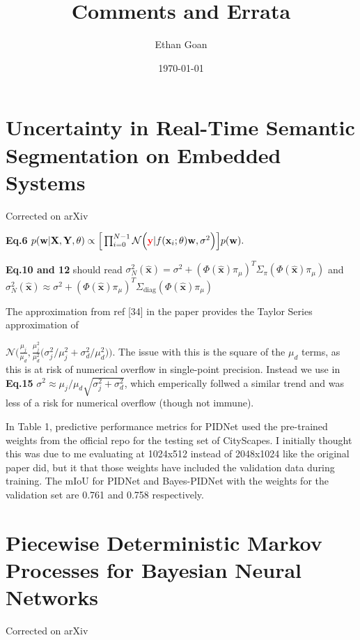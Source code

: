 \documentclass{article}
\title{{\titlefont Comments and Errata}}
\author{{\authorfont Ethan Goan}}
\date{\small \today}
\makeatletter
\renewcommand{\tableofcontents}{\@starttoc{toc}}
\makeatother
\begin{document}
\maketitle
\tableofcontents

\section{Uncertainty in Real-Time Semantic Segmentation on Embedded Systems}
Corrected on arXiv

\textbf{Eq.6}  $ p(\mathbf{w} | \mathbf{X}, \mathbf{Y} , \theta ) \propto \Big[\prod_{i=0}^{N-1}\mathcal{N}\Big({\color{red}\mathbf{y}}|f(\mathbf{x}_{i};\theta) \mathbf{w}, \sigma^{2}\Big)\Big] p(\mathbf{w}).$

\textbf{Eq.10 and 12} should read $\sigma^{2}_{N}(\hat{\mathbf{x}}) =
\sigma^{2} + (\Phi(\hat{\mathbf{x}})\pi_{\mu})^{T}\Sigma_{\pi} (\Phi(\hat{\mathbf{x}})\pi_{\mu})$ and
$\sigma^{2}_{N}(\hat{\mathbf{x}}) \approx \sigma^{2} +
(\Phi(\hat{\mathbf{x}})\pi_{\mu})^{T}\Sigma_{\text{diag}}(\Phi(\hat{\mathbf{x}})\pi_{\mu})$

The approximation from ref [34] in the paper provides the Taylor Series approximation of

$ \mathcal{N}\Big(\frac{\mu_{j}}{\mu_{d}},\frac{\mu_{j}^{2}}{\mu_{d}^{2}}\big(\sigma^{2}_{j} / \mu_{j}^{2} +  \sigma^{2}_{d} / \mu_{d}^{2} \big)\Big)$. The issue with this is the square of the $\mu_{d}$ terms, as this is at risk of numerical overflow in single-point precision. Instead we use in \textbf{Eq.15} $\sigma^{2} \approx \mu_{j} / \mu_{d}\sqrt{\sigma^{2}_{j} + \sigma^{2}_{d}}$, which emperically follwed a similar trend and was less of a risk for numerical overflow (though not immune).

In Table 1, predictive performance metrics for PIDNet used the pre-trained weights from the official repo for the testing set of CityScapes. I initially thought this was due to me evaluating at 1024x512 instead of 2048x1024 like the original paper did, but it that those weights have included the validation data during training. The mIoU for PIDNet and Bayes-PIDNet with the weights for the validation set are 0.761 and 0.758 respectively.

\vspace*{1cm}
\section{Piecewise Deterministic Markov Processes for Bayesian Neural Networks}
Corrected on arXiv
\end{document}
